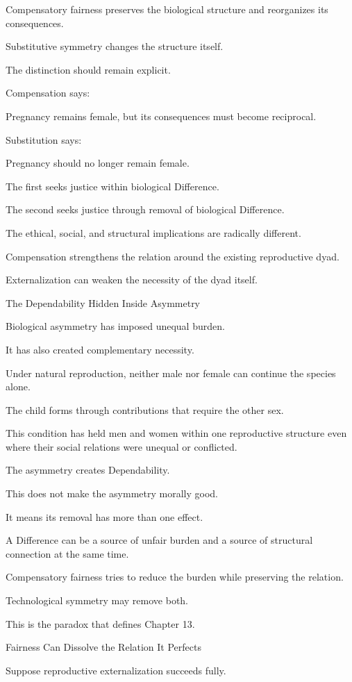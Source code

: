 Compensatory fairness preserves the biological structure and reorganizes its consequences.

Substitutive symmetry changes the structure itself.

The distinction should remain explicit.

Compensation says:

Pregnancy remains female, but its consequences must become reciprocal.

Substitution says:

Pregnancy should no longer remain female.

The first seeks justice within biological Difference.

The second seeks justice through removal of biological Difference.

The ethical, social, and structural implications are radically different.

Compensation strengthens the relation around the existing reproductive dyad.

Externalization can weaken the necessity of the dyad itself.

The Dependability Hidden Inside Asymmetry

Biological asymmetry has imposed unequal burden.

It has also created complementary necessity.

Under natural reproduction, neither male nor female can continue the species alone.

The child forms through contributions that require the other sex.

This condition has held men and women within one reproductive structure even where their social relations were unequal or conflicted.

The asymmetry creates Dependability.

This does not make the asymmetry morally good.

It means its removal has more than one effect.

A Difference can be a source of unfair burden and a source of structural connection at the same time.

Compensatory fairness tries to reduce the burden while preserving the relation.

Technological symmetry may remove both.

This is the paradox that defines Chapter 13.

Fairness Can Dissolve the Relation It Perfects

Suppose reproductive externalization succeeds fully.


